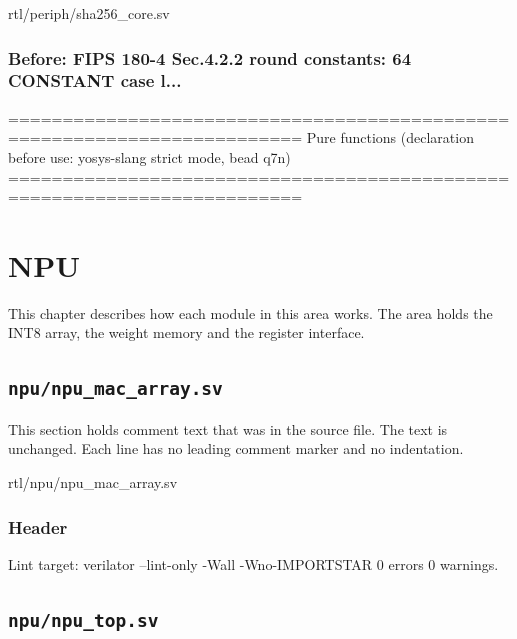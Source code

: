 \begin{relocated}{rtl/periph/sha256_core.sv}
\subsection*{Before: FIPS 180-4 Sec.4.2.2 round constants: 64 CONSTANT case l...}

\begin{textblock}
=========================================================================
Pure functions (declaration before use: yosys-slang strict mode, bead q7n)
=========================================================================
\end{textblock}

\end{relocated}








\chapter{NPU}\label{tm:ch:mod-npu}

This chapter describes how each module in this area works. The area holds the INT8 array, the weight memory and the register interface.

\section{\texttt{npu/npu\_mac\_array.sv}}\label{tm:mod:npu-mac-array}

This section holds comment text that was in the source file. The text is unchanged. Each line has no leading comment marker and no indentation.

\begin{relocated}{rtl/npu/npu_mac_array.sv}

\subsection*{Header}

\begin{textblock}
Lint target: verilator --lint-only -Wall -Wno-IMPORTSTAR 0 errors 0 warnings.
\end{textblock}

\end{relocated}

\section{\texttt{npu/npu\_top.sv}}\label{tm:mod:npu-top}

